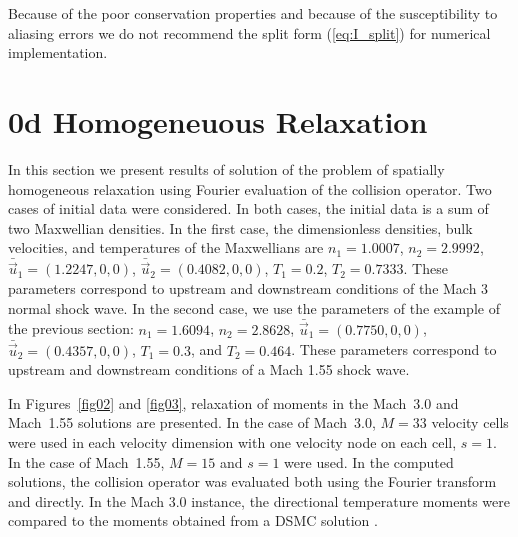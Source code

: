 \documentclass[12pt]{CSUNthesis}
\begin{document}
Because of the poor conservation properties and because of the 
susceptibility to aliasing errors we do not recommend the 
split form (\ref{eq:I_split}) for numerical implementation. 


\section{0d Homogeneuous Relaxation}

In this section we present results of solution of the problem of 
spatially homogeneous relaxation using Fourier evaluation of the 
collision operator. Two cases of initial data were considered. In 
both cases, the initial data is a sum of two Maxwellian densities. 
In the first case, the 
dimensionless densities, bulk velocities, and temperatures of the 
Maxwellians are $n_1=1.0007$, $n_2=2.9992$, 
$\bar{\vec{u}}_{1}=(1.2247,0,0)$, $\bar{\vec{u}}_{2}=(0.4082,0,0)$,
$T_{1}=0.2$, $T_{2}=0.7333$. These parameters correspond to upstream 
and downstream conditions of the Mach 3 normal shock wave.  
In the second case, we use the parameters of the example of the previous  
section: $n_{1}=1.6094$, $n_{2}=2.8628$, $\bar{\vec{u}}_{1}=(0.7750,0,0)$, $\bar{\vec{u}}_{2}=(0.4357,0,0)$, $T_{1}=0.3$, and $T_{2}=0.464$. These 
parameters correspond to upstream and downstream conditions of a Mach 1.55 
shock wave. 

In Figures~{\ref{fig02}} and {\ref{fig03}}, relaxation of moments in the 
Mach~3.0 and Mach~1.55 solutions are presented. In the case of Mach~3.0, 
$M=33$ velocity cells were used in each velocity dimension with one 
velocity node on each cell, $s=1$. In the case of Mach~1.55, $M=15$ and $s=1$ 
were used. In the computed solutions, the collision operator was evaluated 
both using the Fourier transform and directly. In the Mach 3.0 instance, the directional 
temperature moments were compared to the moments obtained from a DSMC solution
\cite{Boyd1991411}. 
\end{document}
